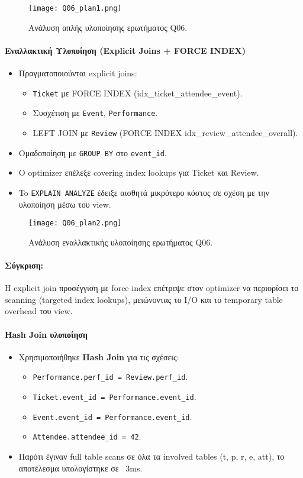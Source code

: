 \documentclass[13pt]{extarticle}
\begin{document}
\begin{figure}[H]
    \centering
    \texttt{[image: Q06\_plan1.png]}
    \caption{Ανάλυση απλής υλοποίησης ερωτήματος Q06.}
\end{figure}

\paragraph{Εναλλακτική Υλοποίηση (Explicit Joins + FORCE INDEX)}
\begin{itemize}
    \item Πραγματοποιούνται explicit joins:
    \begin{itemize}
        \item \texttt{Ticket} με FORCE INDEX (idx\_ticket\_attendee\_event).
        \item Συσχέτιση με \texttt{Event}, \texttt{Performance}.
        \item LEFT JOIN με \texttt{Review} (FORCE INDEX idx\_review\_attendee\_overall).
    \end{itemize}
    \item Ομαδοποίηση με \texttt{GROUP BY} στο \texttt{event\_id}.
    \item Ο optimizer επέλεξε covering index lookups για Ticket και Review.
    \item To \texttt{EXPLAIN ANALYZE} έδειξε αισθητά μικρότερο κόστος σε σχέση με την υλοποίηση μέσω του view.
\end{itemize}

\begin{figure}[H]
    \centering
    \texttt{[image: Q06\_plan2.png]}
    \caption{Ανάλυση εναλλακτικής υλοποίησης ερωτήματος Q06.}
\end{figure}

\paragraph{Σύγκριση:}  
Η explicit join προσέγγιση με force index επέτρεψε στον optimizer να περιορίσει το scanning (targeted index lookups), μειώνοντας το I/O και το temporary table overhead του view.

\paragraph{Hash Join υλοποίηση}
\begin{itemize}
    \item Χρησιμοποιήθηκε \textbf{Hash Join} για τις σχέσεις:
    \begin{itemize}
        \item \texttt{Performance.perf\_id = Review.perf\_id}.
        \item \texttt{Ticket.event\_id = Performance.event\_id}.
        \item \texttt{Event.event\_id = Performance.event\_id}.
        \item \texttt{Attendee.attendee\_id = 42}.
    \end{itemize}
    \item Παρότι έγιναν full table scans σε όλα τα involved tables (t, p, r, e, att), το αποτέλεσμα υπολογίστηκε σε ~3ms.
\end{itemize}
\end{document}
